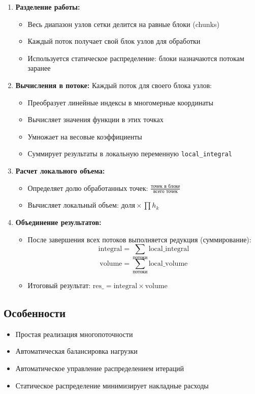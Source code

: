\documentclass[12pt]{article}
\begin{document}
\begin{enumerate}
    \item \textbf{Разделение работы:}
    \begin{itemize}
        \item Весь диапазон узлов сетки делится на равные блоки (chunks)
        \item Каждый поток получает свой блок узлов для обработки
        \item Используется статическое распределение: блоки назначаются потокам заранее
    \end{itemize}
    
    \item \textbf{Вычисления в потоке:}
    Каждый поток для своего блока узлов:
    \begin{itemize}
        \item Преобразует линейные индексы в многомерные координаты
        \item Вычисляет значения функции в этих точках
        \item Умножает на весовые коэффициенты
        \item Суммирует результаты в локальную переменную \texttt{local\_integral}
    \end{itemize}
    
    \item \textbf{Расчет локального объема:}
    \begin{itemize}
        \item Определяет долю обработанных точек: $\frac{\text{точек в блоке}}{\text{всего точек}}$
        \item Вычисляет локальный объем: $\text{доля} \times \prod h_k$
    \end{itemize}
    
    \item \textbf{Объединение результатов:}
    \begin{itemize}
        \item После завершения всех потоков выполняется редукция (суммирование):
        \[
        \text{integral} = \sum_{\text{потоки}} \text{local\_integral}
        \]
        \[
        \text{volume} = \sum_{\text{потоки}} \text{local\_volume}
        \]
        \item Итоговый результат: $\text{res\_} = \text{integral} \times \text{volume}$
    \end{itemize}
\end{enumerate}

\subsection*{Особенности}
\begin{itemize}
    \item Простая реализация многопоточности
    \item Автоматическая балансировка нагрузки
    \item Автоматическое управление распределением итераций
    \item Статическое распределение минимизирует накладные расходы
\end{itemize}
\end{document}
